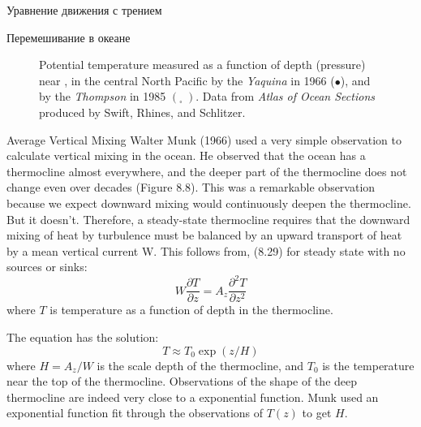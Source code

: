 \begin{chapter}{Уравнение движения с трением}
\begin{section}{Перемешивание в океане}
\begin{figure}[t!]
\caption{Potential temperature measured as a function of depth
(pressure) near ,  in the central
North Pacific by the \textit{Yaquina} in 1966 ($\bullet$), and by the
\textit{Thompson} in 1985 $\left( _\square \;\right)$. Data from
\textit{Atlas of Ocean Sections} produced by Swift, Rhines, and
Schlitzer.}
\label{fig:mixing}
\end{figure}

\begin{paragraph}{Average Vertical Mixing}
Walter Munk (1966) used a very simple observation to calculate
vertical mixing in the ocean. He observed that the ocean has a
thermocline almost everywhere, and the deeper part of the thermocline
does not change even over decades (Figure 8.8). This was a remarkable
observation because we expect downward mixing would continuously
deepen the thermocline. But it doesn't. Therefore, a steady-state
thermocline requires that the downward mixing of heat by turbulence
must be balanced by an upward transport of heat by a mean vertical
current W. This follows from, (8.29) for steady state with no sources
or sinks:
\begin{equation}
W \frac{\partial T}{\partial z} = A_z \frac{\partial^2 T}{\partial z^2}
\end{equation}
where $T$ is temperature as a function of depth in the thermocline.

The equation has the solution:
\begin{equation}
T \approx T_0 \exp (z/H)
\end{equation}
where $H=A_z/W$ is the scale depth of the
thermocline, and $T_0$ is the temperature near the
top of the thermocline. Observations of the shape of the deep
thermocline are indeed very close to a exponential function.  Munk
used an exponential function fit through the observations of $T(z)$ to
get $H$.


\end{paragraph}
\end{section}
\end{chapter}

